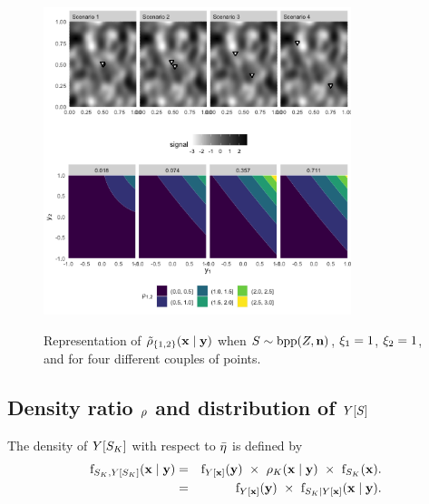 
\begin{figure}[H]
\centering
\caption{Representation of $\tilde{\rho}_{\lbrace 1,2\rbrace}(\mathbf{x}\mid\mathbf{y})$ when $S \sim \mathrm{bpp}(Z,\mathbf{n})$, $\xi_{1} = 1$, $\xi_{2}=1$, and for four different couples of points.}
\includegraphics[width = 0.8\textwidth]{fig/rho_12_contour.png}
\label{fig:rho_12}
\end{figure}







\subsection{Density ratio $\rho$ and distribution of \texorpdfstring{$Y[S]$}{Y[\Sample_\Sampleindex]} }
The density of $Y[S_K]$ with respect to $\bar{\eta}$ is defined by
\begin{eqnarray}\mathrm{f}_{S_K,Y[S_K]}(\mathbf{x}\mid\mathbf{y})&=& \mathrm{f}_{Y[\mathbf{x}]}(\mathbf{y})~\times~\rho_{K}(\mathbf{x}\mid\mathbf{y})~\times~\mathrm{f}_{S_K}(\mathbf{x}).\label{eq:iuhsdewripeowi}\\
&=& \mathrm{f}_{Y[\mathbf{x}]}(\mathbf{y})~\times~\mathrm{f}_{S_K\mid Y[\mathbf{x}]}(\mathbf{x}\mid\mathbf{y}).\label{eq:iuhsdewripeowi2}
\end{eqnarray}

